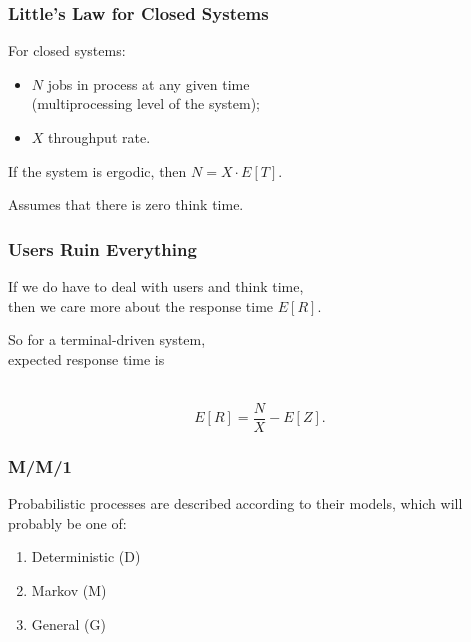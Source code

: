 \begin{frame}
\frametitle{Little's Law for Closed Systems}

\large
\begin{changemargin}{2cm}

For closed systems:\\
\begin{itemize} 
\item $N$ jobs in process at any given time\\
\qquad (multiprocessing level of the system);
\item $X$ throughput rate.
\end{itemize}

If the system is ergodic, then $N = X \cdot E[T]$.

Assumes that there is zero think time.
 \end{changemargin}
\end{frame}



\begin{frame}
\frametitle{Users Ruin Everything}

\large
\begin{changemargin}{2cm}
If we do have to deal with users and think time, \\
then we care more about the response time $E[R]$. 

So for a terminal-driven system,\\
 expected response time is 
\end{changemargin}
~\\[-4em]
\[ E[R] = \dfrac{N}{X} - E[Z]. \]

\end{frame}



\begin{frame}
\frametitle{M/M/1}

\Large
\begin{changemargin}{2cm}
Probabilistic processes are described according to their models, which will probably be one of:

\begin{enumerate}
	\item Deterministic (D)	
	\item Markov (M)
	\item General (G)
\end{enumerate}
\end{changemargin}

\end{frame}



